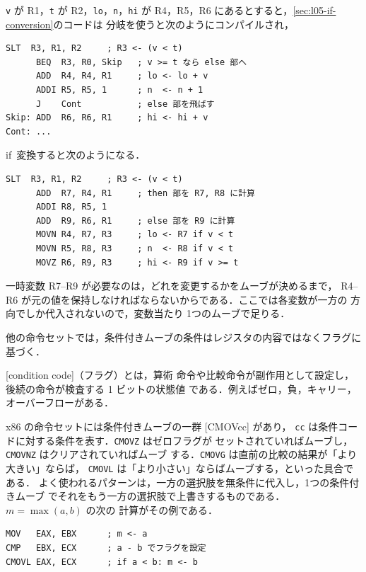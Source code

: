 \documentclass[../main.tex]{subfiles}
\begin{document}
\begin{example}
  \label{ex:l05-movzn}
  \texttt{v} が R1，\texttt{t} が R2，\texttt{lo}，\texttt{n}，\texttt{hi}
  が R4，R5，R6 にあるとすると，\cref{sec:l05-if-conversion}のコードは
  分岐を使うと次のようにコンパイルされ，
  \begin{lstlisting}[language={[x86masm]Assembler}, numbers=none]
      SLT  R3, R1, R2     ; R3 <- (v < t)
      BEQ  R3, R0, Skip   ; v >= t なら else 部へ
      ADD  R4, R4, R1     ; lo <- lo + v
      ADDI R5, R5, 1      ; n  <- n + 1
      J    Cont           ; else 部を飛ばす
Skip: ADD  R6, R6, R1     ; hi <- hi + v
Cont: ...
\end{lstlisting}
  if~変換すると次のようになる．
  \begin{lstlisting}[language={[x86masm]Assembler}, numbers=none]
      SLT  R3, R1, R2     ; R3 <- (v < t)
      ADD  R7, R4, R1     ; then 部を R7, R8 に計算
      ADDI R8, R5, 1
      ADD  R9, R6, R1     ; else 部を R9 に計算
      MOVN R4, R7, R3     ; lo <- R7 if v < t
      MOVN R5, R8, R3     ; n  <- R8 if v < t
      MOVZ R6, R9, R3     ; hi <- R9 if v >= t
\end{lstlisting}
  一時変数 R7--R9 が必要なのは，どれを変更するかをムーブが決めるまで，
  R4--R6 が元の値を保持しなければならないからである．ここでは各変数が一方の
  方向でしか代入されないので，変数当たり 1つのムーブで足りる．
\end{example}

他の命令セットでは，条件付きムーブの条件はレジスタの内容ではなくフラグに
基づく．

\begin{definition}[条件コード]
  \label{def:l05-condition-code}
  [condition code]（フラグ）とは，算術
  命令や比較命令が副作用として設定し，後続の命令が検査する 1 ビットの状態値
  である．例えばゼロ，負，キャリー，オーバーフローがある．
\end{definition}

x86 の命令セットには条件付きムーブの一群 [CMOVcc] があり，
\texttt{cc} は条件コードに対する条件を表す．\texttt{CMOVZ} はゼロフラグが
セットされていればムーブし，\texttt{CMOVNZ} はクリアされていればムーブ
する．\texttt{CMOVG} は直前の比較の結果が「より大きい」ならば，
\texttt{CMOVL} は「より小さい」ならばムーブする，といった具合である．
よく使われるパターンは，一方の選択肢を無条件に代入し，1つの条件付きムーブ
でそれをもう一方の選択肢で上書きするものである．$m = \max(a,b)$ の次の
計算がその例である．
\begin{lstlisting}[language={[x86masm]Assembler}, numbers=none]
MOV   EAX, EBX      ; m <- a
CMP   EBX, ECX      ; a - b でフラグを設定
CMOVL EAX, ECX      ; if a < b: m <- b
\end{lstlisting}
\end{document}
